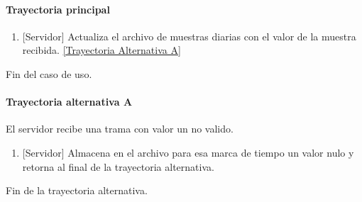 \paragraph{Trayectoria principal}
    \label{SUB-M-CU1.5:TP}
	\begin{enumerate}
	    \item {[Servidor]} Actualiza el archivo de muestras diarias con el valor de la muestra recibida. \hyperref[SUB-M-CU1.11:TA]{[Trayectoria Alternativa A]}
	\end{enumerate}
	Fin del caso de uso.
	
\paragraph{Trayectoria alternativa A} \label{SUB-M-CU1.11:TA}
	El servidor recibe una trama con valor un no valido.
	\begin{enumerate}[label=A\arabic*.]
		\item {[Servidor]} Almacena en el archivo para esa marca de tiempo un valor nulo y retorna al final de la trayectoria alternativa.
	\end{enumerate}
	Fin de la trayectoria alternativa.
